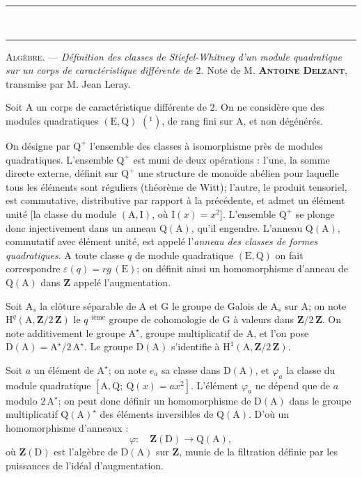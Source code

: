 \begin{center}\rule{.88\linewidth}{.35pt}\\[-.85em]\rule{.88\linewidth}{.65pt}\end{center}
\textsc{Algèbre}. --- \emph{Définition des classes de Stiefel-Whitney d'un module quadratique sur un corps de caractéristique différente de $2$.} Note de M. \textbf{\textsc{Antoine Delzant}}, transmise par M. Jean Leray.

Soit $\mathrm A$ un corps de caractéristique différente de $2$. On ne considère que des modules quadratiques $(\mathrm E,\mathrm Q)$ $(^{1})$, de rang fini sur $\mathrm A$, et non dégénérés.

On désigne par $\mathrm Q^{+}$ l'ensemble des classes à isomorphisme près de modules quadratiques. L'ensemble $\mathrm Q^{+}$ est muni de deux opérations : l'une, la somme directe externe, définit sur $\mathrm Q^{+}$ une structure de monoïde abélien pour laquelle tous les éléments sont réguliers (théorème de Witt); l'autre, le produit tensoriel, est commutative, distributive par rapport à la précédente, et admet un élément unité [la classe du module $(\mathrm A,\mathrm I)$, où $\mathrm I(x)=x^{2}$]. L'ensemble $\mathrm Q^{+}$ se plonge donc injectivement dans un anneau $\mathrm Q(\mathrm A)$, qu'il engendre. L'anneau $\mathrm Q(\mathrm A)$, commutatif avec élément unité, est appelé l'\emph{anneau des classes de formes quadratiques}. A toute classe $q$ de module quadratique $(\mathrm E,\mathrm Q)$ on fait correspondre $\varepsilon(q)=rg\,(\mathrm E)$; on définit ainsi un homomorphisme d'anneau de $\mathrm Q(\mathrm A)$ dans $\mathbf Z$ appelé l'augmentation.

Soit $\mathrm A_{s}$ la clôture séparable de $\mathrm A$ et $\mathrm G$ le groupe de Galois de $\mathrm A_{s}$ sur $\mathrm A$; on note $\mathrm H^{q}(\mathrm A,\mathbf Z/2\,\mathbf Z)$ le $q^{\text{--ième}}$ groupe de cohomologie de $\mathrm G$ à valeurs dans $\mathbf Z/2\,\mathbf Z$. On note additivement le groupe $\mathrm A^{\star}$, groupe multiplicatif de $\mathrm A$, et l'on pose $\mathrm D(\mathrm A)=\mathrm A^{\star}/2\,\mathrm A^{\star}$. Le groupe $\mathrm D(\mathrm A)$ s'identifie à $\mathrm H^{1}(\mathrm A,\mathbf Z/2\,\mathbf Z)$.

Soit $a$ un élément de $\mathrm A^{\star}$; on note $e_{a}$ sa classe dans $\mathrm D(\mathrm A)$, et $\varphi_{a}$ la classe du module quadratique $[\mathrm A,\mathrm Q;\ \mathrm Q(x)=ax^{2}]$. L'élément $\varphi_{a}$ ne dépend que de $a$ modulo $2\,\mathrm A^{\star}$; on peut donc définir un homomorphisme de $\mathrm D(\mathrm A)$ dans le groupe multiplicatif $\mathrm Q(\mathrm A)^{\star}$ des éléments inversibles de $\mathrm Q(\mathrm A)$. D'où un homomorphisme d'anneaux :
\[
\varphi:\quad \mathbf Z(\mathrm D)\to\mathrm Q(\mathrm A),
\]
où $\mathbf Z(\mathrm D)$ est l'algèbre de $\mathrm D(\mathrm A)$ sur $\mathbf Z$, munie de la filtration définie par les puissances de l'idéal d'augmentation.

